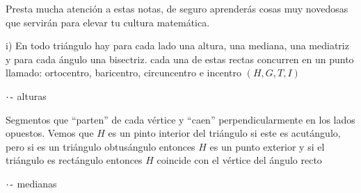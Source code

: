 Presta mucha atención a estas notas, de seguro aprenderás cosas muy novedosas que servirán para elevar tu cultura matemática.

i) En todo triángulo hay para cada lado una altura, una mediana, una mediatriz y para cada ángulo una bisectriz. cada una de estas rectas concurren en un punto llamado: ortocentro, baricentro, circuncentro e incentro $(H, G, T, I)$

\vspace{0.5cm}
$\cdot\hspace{0.05cm}\text{-}$ alturas

\noindent\parbox[][][t]{.3\linewidth}{
}
\parbox[][][t]{.05\linewidth}{\hspace{.03\linewidth}}
\parbox[][][t]{.65\linewidth}{
 Segmentos que ``parten'' de cada vértice y ``caen'' perpendicularmente en los lados opuestos. Vemos que $H$ es un pinto interior del triángulo si este es acutángulo, pero si es un triángulo obtusángulo entonces $H$ es un punto exterior y si el triángulo es rectángulo entonces $H$ coincide con el vértice del ángulo recto
}

\vspace{0.5cm}
$\cdot\hspace{0.05cm}\text{-}$ medianas

